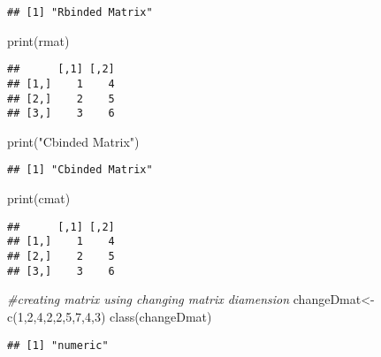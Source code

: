 \documentclass[
]{article}
\newenvironment{Shaded}{\begin{snugshade}}{\end{snugshade}}
\newcommand{\CommentTok}[1]{\textcolor[rgb]{0.56,0.35,0.01}{\textit{#1}}}
\newcommand{\DecValTok}[1]{\textcolor[rgb]{0.00,0.00,0.81}{#1}}
\newcommand{\FunctionTok}[1]{\textcolor[rgb]{0.00,0.00,0.00}{#1}}
\newcommand{\NormalTok}[1]{#1}
\newcommand{\OtherTok}[1]{\textcolor[rgb]{0.56,0.35,0.01}{#1}}
\newcommand{\StringTok}[1]{\textcolor[rgb]{0.31,0.60,0.02}{#1}}
\begin{document}
\begin{verbatim}
## [1] "Rbinded Matrix"
\end{verbatim}

\begin{Shaded}
\begin{Highlighting}[]
\FunctionTok{print}\NormalTok{(rmat)}
\end{Highlighting}
\end{Shaded}

\begin{verbatim}
##      [,1] [,2]
## [1,]    1    4
## [2,]    2    5
## [3,]    3    6
\end{verbatim}

\begin{Shaded}
\begin{Highlighting}[]
\FunctionTok{print}\NormalTok{(}\StringTok{"Cbinded Matrix"}\NormalTok{)}
\end{Highlighting}
\end{Shaded}

\begin{verbatim}
## [1] "Cbinded Matrix"
\end{verbatim}

\begin{Shaded}
\begin{Highlighting}[]
\FunctionTok{print}\NormalTok{(cmat)}
\end{Highlighting}
\end{Shaded}

\begin{verbatim}
##      [,1] [,2]
## [1,]    1    4
## [2,]    2    5
## [3,]    3    6
\end{verbatim}

\begin{Shaded}
\begin{Highlighting}[]
\CommentTok{\#creating matrix using changing matrix diamension}
\NormalTok{changeDmat}\OtherTok{\textless{}{-}}\FunctionTok{c}\NormalTok{(}\DecValTok{1}\NormalTok{,}\DecValTok{2}\NormalTok{,}\DecValTok{4}\NormalTok{,}\DecValTok{2}\NormalTok{,}\DecValTok{2}\NormalTok{,}\DecValTok{5}\NormalTok{,}\DecValTok{7}\NormalTok{,}\DecValTok{4}\NormalTok{,}\DecValTok{3}\NormalTok{)}
\FunctionTok{class}\NormalTok{(changeDmat)}
\end{Highlighting}
\end{Shaded}

\begin{verbatim}
## [1] "numeric"
\end{verbatim}
\end{document}

